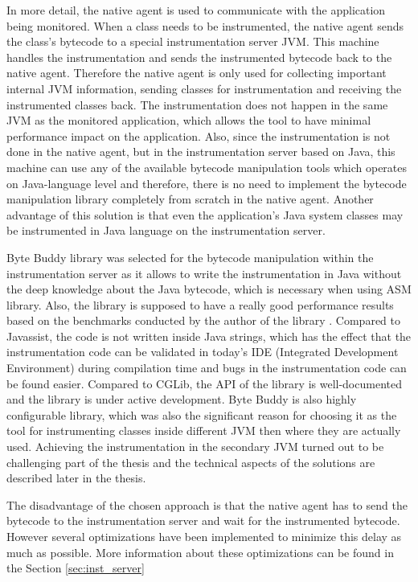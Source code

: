 In more detail, the native agent is used to communicate with the application being monitored. When a class needs to be instrumented, the native agent sends the class's bytecode to a special instrumentation server JVM. This machine handles the instrumentation and sends the instrumented bytecode back to the native agent. Therefore the native agent is only used for collecting important internal JVM information, sending classes for instrumentation and receiving the instrumented classes back. The instrumentation does not happen in the same JVM as the monitored application, which allows the tool to have minimal performance impact on the application. Also, since the instrumentation is not done in the native agent, but in the instrumentation server based on Java, this machine can use any of the available bytecode manipulation tools which operates on Java-language level and therefore, there is no need to implement the bytecode manipulation library completely from scratch in the native agent. Another advantage of this solution is that even the application's Java system classes may be instrumented in Java language on the instrumentation server.

Byte Buddy library was selected for the bytecode manipulation within the instrumentation server  as it allows to write the instrumentation in Java without the deep knowledge about the Java bytecode, which is necessary when using ASM library. Also, the library is supposed to have a really good performance results based on the benchmarks conducted by the author of the library \cite{ByteBuddy_Perf}. Compared to Javassist, the code is not written inside Java strings, which has the effect that the instrumentation code can be validated in today's IDE (Integrated Development Environment) during compilation time and bugs in the instrumentation code can be found easier. Compared to CGLib, the API of the library is well-documented and the library is under active development. Byte Buddy is also highly configurable library, which was also the significant reason for choosing it as the tool for instrumenting classes inside different JVM then where they are actually used. Achieving the instrumentation in the secondary JVM  turned out to be challenging part of the thesis and the technical aspects of the solutions are described later in the thesis.

The disadvantage of the chosen approach is that the native agent has to send the bytecode to the instrumentation server and wait for the instrumented bytecode. However several optimizations have been implemented to minimize this delay as much as possible. More information about these optimizations can be found in the Section \ref{sec:inst_server}
			
